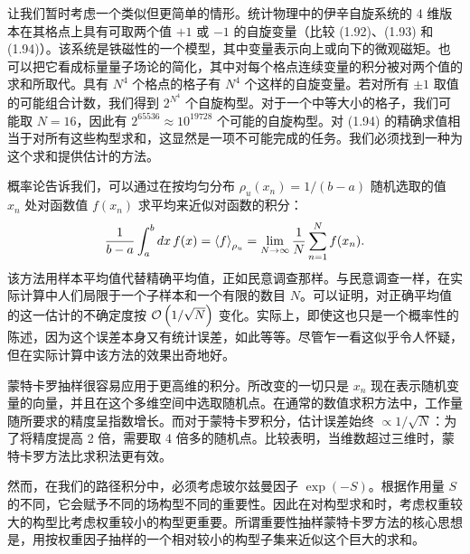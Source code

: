 让我们暂时考虑一个类似但更简单的情形。统计物理中的伊辛自旋系统的 4 维版本在其格点上具有可取两个值 $+1$ 或 $-1$ 的自旋变量（比较 (1.92)、(1.93) 和 (1.94)）。该系统是铁磁性的一个模型，其中变量表示向上或向下的微观磁矩。也可以把它看成标量量子场论的简化，其中对每个格点连续变量的积分被对两个值的求和所取代。具有 $N^4$ 个格点的格子有 $N^4$ 个这样的自旋变量。若对所有 $\pm 1$ 取值的可能组合计数，我们得到 $2^{N^4}$ 个自旋构型。对于一个中等大小的格子，我们可能取 $N = 16$，因此有 $2^{65536} \approx 10^{19728}$ 个可能的自旋构型。对 (1.94) 的精确求值相当于对所有这些构型求和，这显然是一项不可能完成的任务。我们必须找到一种为这个求和提供估计的方法。

概率论告诉我们，可以通过在按均匀分布 $\rho_u(x_n) = 1/(b-a)$ 随机选取的值 $x_n$ 处对函数值 $f(x_n)$ 求平均来近似对函数的积分：
\begin{equation}
  \frac{1}{b-a}\int_a^b dx\,f(x) = \left\langle f \right\rangle_{\rho_u} = \lim_{N\to\infty}\frac{1}{N}\sum_{n=1}^{N} f(x_n).
\end{equation}
该方法用样本平均值代替精确平均值，正如民意调查那样。与民意调查一样，在实际计算中人们局限于一个子样本和一个有限的数目 $N$。可以证明，对正确平均值的这一估计的不确定度按 $\mathcal{O}\left(1/\sqrt{N}\right)$ 变化。实际上，即使这也只是一个概率性的陈述，因为这个误差本身又有统计误差，如此等等。尽管乍一看这似乎令人怀疑，但在实际计算中该方法的效果出奇地好。

蒙特卡罗抽样很容易应用于更高维的积分。所改变的一切只是 $x_n$ 现在表示随机变量的向量，并且在这个多维空间中选取随机点。在通常的数值求积方法中，工作量随所要求的精度呈指数增长。而对于蒙特卡罗积分，估计误差始终 $\propto 1/\sqrt{N}$：为了将精度提高 2 倍，需要取 4 倍多的随机点。比较表明，当维数超过三维时，蒙特卡罗方法比求积法更有效。

然而，在我们的路径积分中，必须考虑玻尔兹曼因子 $\exp(-S)$。根据作用量 $S$ 的不同，它会赋予不同的场构型不同的重要性。因此在对构型求和时，考虑权重较大的构型比考虑权重较小的构型更重要。所谓重要性抽样蒙特卡罗方法的核心思想是，用按权重因子抽样的一个相对较小的构型子集来近似这个巨大的求和。

